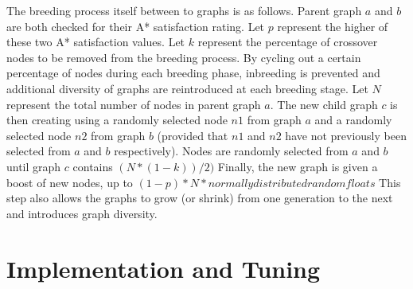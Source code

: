 	The breeding process itself between to graphs is as follows. Parent graph \(a\) and \(b\) are both checked for their A* satisfaction rating. Let \(p\) represent the higher of these two A* satisfaction values. Let \(k\) represent the percentage of crossover nodes to be removed from the breeding process. By cycling out a certain percentage of nodes during each breeding phase, inbreeding is prevented and additional diversity of graphs are reintroduced at each breeding stage. Let \(N\) represent the total number of nodes in parent graph \(a\). The new child graph \(c\) is then creating using a randomly selected node \(n1\) from graph \(a\) and a randomly selected node \(n2\) from graph \(b\) (provided that \(n1\) and \(n2\) have not previously been selected from \(a\) and \(b\) respectively). Nodes are randomly selected from \(a\) and \(b\) until graph \(c\) contains \((N*(1-k))/2)\) Finally, the new graph is given a boost of new nodes, up to \((1-p)*N * normally distributed random floats\) This step also allows the graphs to grow (or shrink) from one generation to the next and introduces graph diversity.

\section{Implementation and Tuning}